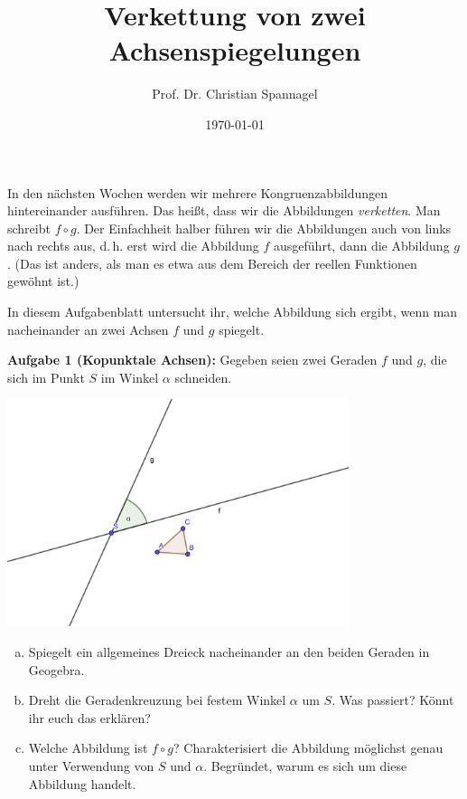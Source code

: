 \documentclass{../cssheet}
\title{Verkettung von zwei Achsenspiegelungen}
\author{Prof. Dr. Christian Spannagel}
\date{\today}
\begin{document}
\printtitle

In den nächsten Wochen werden wir mehrere Kongruenzabbildungen hintereinander ausführen. Das heißt, dass wir die Abbildungen \emph{verketten}. Man schreibt $f\circ g$. Der Einfachheit halber führen wir die Abbildungen auch von links nach rechts aus, d.\,h. erst wird die Abbildung $f$ ausgeführt, dann die Abbildung $g$. (Das ist anders, als man es etwa aus dem Bereich der reellen Funktionen gewöhnt ist.)
 
In diesem Aufgabenblatt untersucht ihr, welche Abbildung sich ergibt, wenn man nacheinander an zwei Achsen $f$ und $g$ spiegelt. 

\textbf{Aufgabe 1 (Kopunktale Achsen):}  Gegeben seien zwei Geraden $f$ und $g$, die sich im Punkt $S$ im Winkel $\alpha$ schneiden.
\begin{center}
\includegraphics[width=10cm]{sich-schneidende-geraden.png}
\end{center}
\begin{enumerate}[a)]
\item Spiegelt ein allgemeines Dreieck nacheinander an den beiden Geraden in Geogebra. 
\item Dreht die Geradenkreuzung bei festem Winkel $\alpha$ um $S$. Was passiert? Könnt ihr euch das erklären?
\item Welche Abbildung ist $f\circ g$? Charakterisiert die Abbildung möglichst genau unter Verwendung von $S$ und $\alpha$. Begründet, warum es sich um diese Abbildung handelt.
\end{enumerate}
\end{document}
